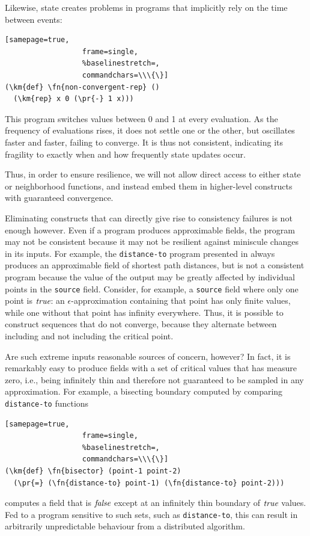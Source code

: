 \documentclass[12pt,a4paper,twoside,openright]{book}
\begin{document}
Likewise, state creates problems in programs that implicitly rely on the time between events:
\begin{samepage}
\begin{Verbatim}[samepage=true,
                  frame=single,
                  %baselinestretch=,
                  commandchars=\\\{\}]
(\km{def} \fn{non-convergent-rep} ()
  (\km{rep} x 0 (\pr{-} 1 x)))
\end{Verbatim}
\end{samepage}
%
This program switches values between 0 and 1 at every evaluation.
%
As the frequency of evaluations rises, it does not settle one or the other, but oscillates faster and faster, failing to converge.
%
It is thus not consistent, indicating its fragility to exactly when and how frequently state updates occur.

Thus, in order to ensure resilience, we will not allow direct access to either state or neighborhood functions, and instead embed them in higher-level constructs with guaranteed convergence.

Eliminating constructs that can directly give rise to consistency failures is not enough however.
%
Even if a program produces approximable fields, the program may not be consistent because it may not be resilient against miniscule changes in its inputs.
%
For example, the {\tt distance-to} program presented in  always produces an approximable field of shortest path distances, but is not a consistent program because
the value of the output may be greatly affected by individual points in the {\tt source} field.
%
Consider, for example, a {\tt source} field where only one point is $\textit{true}$: an $\epsilon$-approximation containing that point has only finite values, while one without that
point has infinity everywhere.
%
Thus, it is possible to construct sequences that do not converge, because they alternate between including and not including the critical point.

Are such extreme inputs reasonable sources of concern, however?
%
In fact, it is remarkably easy to produce fields with a set of critical values that has measure zero, i.e., being infinitely thin and therefore not guaranteed to be sampled in any approximation.
%
For example, a bisecting boundary computed by comparing {\tt distance-to} functions
\begin{samepage}
\begin{Verbatim}[samepage=true,
                  frame=single,
                  %baselinestretch=,
                  commandchars=\\\{\}]
(\km{def} \fn{bisector} (point-1 point-2)
  (\pr{=} (\fn{distance-to} point-1) (\fn{distance-to} point-2)))
\end{Verbatim}
\end{samepage}
computes a field that is $\textit{false}$ except at an infinitely thin boundary of $\textit{true}$ values.  Fed to a program sensitive to such sets, such as {\tt distance-to}, this can result in arbitrarily unpredictable behaviour from a distributed algorithm.
\end{document}
